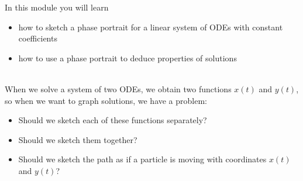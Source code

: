In this module you will learn
\begin{itemize}
	\item how to sketch a phase portrait for a linear system of ODEs with constant coefficients
	\item how to use a phase portrait to deduce properties of solutions
\end{itemize}

\hfill \\

When we solve a system of two ODEs, we obtain two functions $x(t)$ and $y(t)$, so when we want to graph solutions, we have a problem:
\begin{itemize}
	\item Should we sketch each of these functions separately?
	\item Should we sketch them together?
	\item Should we sketch the path as if a particle is moving with coordinates $x(t)$ and $y(t)$?
\end{itemize}

